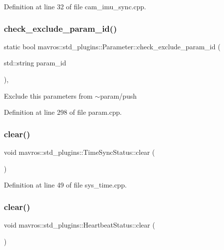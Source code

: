Definition at line 32 of file cam\+\_\+imu\+\_\+sync.\+cpp.

\mbox{\label{group__plugin_ga90b347f43583c077d87ec34b7bfb7164}} 
\subsubsection{\texorpdfstring{check\_exclude\_param\_id()}{check\_exclude\_param\_id()}}
{\footnotesize\ttfamily static bool mavros\+::std\+\_\+plugins\+::\+Parameter\+::check\+\_\+exclude\+\_\+param\+\_\+id (\begin{DoxyParamCaption}\item[{std\+::string}]{param\+\_\+id }\end{DoxyParamCaption})\hspace{0.3cm}{\ttfamily [inline]}, {\ttfamily [static]}}

Exclude this parameters from $\sim$param/push 

Definition at line 298 of file param.\+cpp.

\mbox{\label{group__plugin_ga4a6b530e0d59561986622eda95b86938}} 
\subsubsection{\texorpdfstring{clear()}{clear()}\hspace{0.1cm}{\footnotesize\ttfamily [1/2]}}
{\footnotesize\ttfamily void mavros\+::std\+\_\+plugins\+::\+Time\+Sync\+Status\+::clear (\begin{DoxyParamCaption}{ }\end{DoxyParamCaption})\hspace{0.3cm}{\ttfamily [inline]}}



Definition at line 49 of file sys\+\_\+time.\+cpp.

\mbox{\label{group__plugin_gab6cb3f1f2eb5cf77a1efb3b9b82c0a4b}} 
\subsubsection{\texorpdfstring{clear()}{clear()}\hspace{0.1cm}{\footnotesize\ttfamily [2/2]}}
{\footnotesize\ttfamily void mavros\+::std\+\_\+plugins\+::\+Heartbeat\+Status\+::clear (\begin{DoxyParamCaption}{ }\end{DoxyParamCaption})\hspace{0.3cm}{\ttfamily [inline]}}



